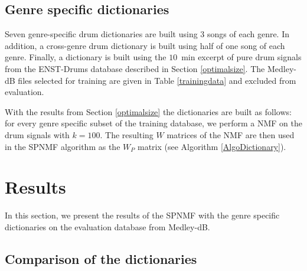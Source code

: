 \documentclass{article}
\begin{document}
\subsection{Genre specific dictionaries}\label{genrespecdict}

Seven genre-specific drum dictionaries are built using $3$ songs of each genre. In addition, a cross-genre drum dictionary is built using half of one song of each genre. Finally, a dictionary is built using the $10$~min excerpt of pure drum signals from the ENST-Drums database described in Section \ref{optimalsize}. The Medley-dB files selected for training are given in Table \ref{trainingdata} and excluded from evaluation. 

With the results from Section \ref{optimalsize} the dictionaries are built as follows: for every genre specific subset of the training database, we perform a NMF on the drum signals with $k=100$. The resulting $W$ matrices of the NMF are then used in the SPNMF algorithm as the  $W_P$ matrix (see Algorithm \ref{AlgoDictionary}).

%   
%  


\section{Results}\label{sec:results}

In this section, we present the results of the SPNMF with the genre specific dictionaries on the evaluation database from Medley-dB.

\subsection{Comparison of the dictionaries}
\end{document}
